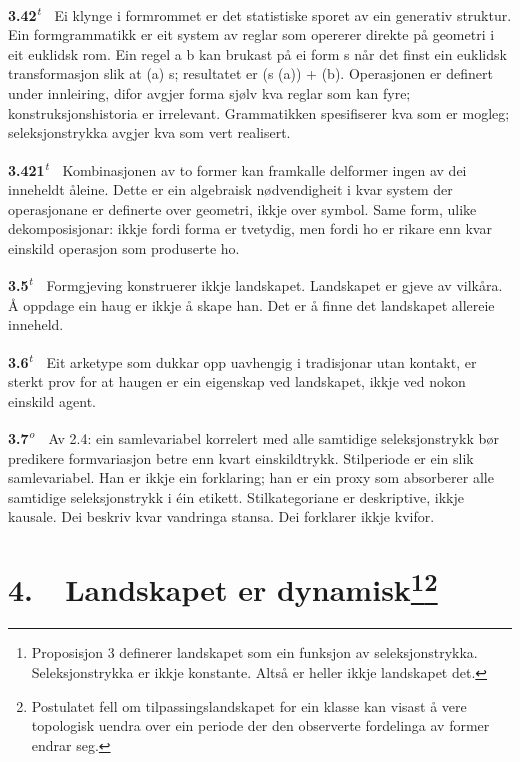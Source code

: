 \documentclass[10pt]{article}
\begin{document}
\noindent\textbf{3.42}\textsuperscript{\textit{t}}~~Ei klynge i formrommet er det statistiske sporet av ein generativ struktur. Ein formgrammatikk er eit system av reglar som opererer direkte på geometri i eit euklidsk rom. Ein regel a  b kan brukast på ei form s når det finst ein euklidsk transformasjon  slik at (a)  s; resultatet er (s  (a)) + (b). Operasjonen er definert under innleiring, difor avgjer forma sjølv kva reglar som kan fyre; konstruksjonshistoria er irrelevant. Grammatikken spesifiserer kva som er mogleg; seleksjonstrykka avgjer kva som vert realisert.




\noindent\textbf{3.421}\textsuperscript{\textit{t}}~~Kombinasjonen av to former kan framkalle delformer ingen av dei inneheldt åleine. Dette er ein algebraisk nødvendigheit i kvar system der operasjonane er definerte over geometri, ikkje over symbol. Same form, ulike dekomposisjonar: ikkje fordi forma er tvetydig, men fordi ho er rikare enn kvar einskild operasjon som produserte ho.




\noindent\textbf{3.5}\textsuperscript{\textit{t}}~~Formgjeving konstruerer ikkje landskapet. Landskapet er gjeve av vilkåra. Å oppdage ein haug er ikkje å skape han. Det er å finne det landskapet allereie inneheld.




\noindent\textbf{3.6}\textsuperscript{\textit{t}}~~Eit arketype som dukkar opp uavhengig i tradisjonar utan kontakt, er sterkt prov for at haugen er ein eigenskap ved landskapet, ikkje ved nokon einskild agent.




\noindent\textbf{3.7}\textsuperscript{\textit{o}}~~Av 2.4: ein samlevariabel korrelert med alle samtidige seleksjonstrykk bør predikere formvariasjon betre enn kvart einskildtrykk. Stilperiode er ein slik samlevariabel. Han er ikkje ein forklaring; han er ein proxy som absorberer alle samtidige seleksjonstrykk i éin etikett. Stilkategoriane er deskriptive, ikkje kausale. Dei beskriv kvar vandringa stansa. Dei forklarer ikkje kvifor.







\chapter*{4.~~Landskapet er dynamisk\footnote{Proposisjon 3 definerer landskapet som ein funksjon av seleksjonstrykka. Seleksjonstrykka er ikkje konstante. Altså er heller ikkje landskapet det.}\footnote{Postulatet fell om tilpassingslandskapet for ein klasse kan visast å vere topologisk uendra over ein periode der den observerte fordelinga av former endrar seg.}}
\end{document}
